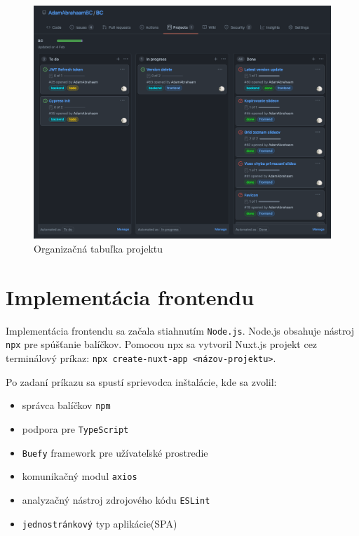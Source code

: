     \begin{figure}[!hbt]
        \centering
        \includegraphics[scale=0.3]{obrazky/board.png}
        \caption{Organizačná tabuľka projektu}
        \label{pic:board}
    \end{figure}

\section{Implementácia frontendu}
Implementácia frontendu sa začala stiahnutím \texttt{Node.js}. Node.js obsahuje nástroj \texttt{npx} pre spúšťanie balíčkov. Pomocou npx sa vytvoril Nuxt.js projekt cez terminálový príkaz: \texttt{npx create-nuxt-app <názov-projektu>}. 

\vspace{5mm}
Po zadaní príkazu sa spustí sprievodca inštalácie, kde sa zvolil:
    \begin{itemize}
        \item správca balíčkov \texttt{npm}
        \item podpora pre \texttt{TypeScript}
        \item \texttt{Buefy} framework pre užívateľské prostredie
        \item komunikačný modul \texttt{axios}
        \item analyzačný nástroj zdrojového kódu \texttt{ESLint} 
        \item \texttt{jednostránkový} typ aplikácie(SPA)
    \end{itemize}
    
